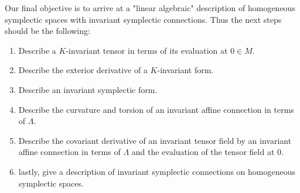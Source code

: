 \documentclass[a4paper,12pt,parskip=half*,chapterprefix=true,numbers=noendperiod]{scrreprt}
\theoremstyle{definition}
\theoremstyle{remark}
\begin{document}
Our final objective is to arrive at a "linear algebraic" description of homogeneous symplectic spaces with invariant symplectic connections. Thus the next steps should be the following:
\begin{enumerate}
	\item Describe a $K$-invariant tensor in terms of its evaluation at $0\in M$.
	\item Describe the exterior derivative of a $K$-invariant form.
	\item Describe an invariant symplectic form.
	\item Describe the curvature and torsion of an invariant affine connection in terms of $\Lambda$.
	\item Describe the covariant derivative of an invariant tensor field by an invariant affine connection in terms of $\Lambda$ and the evaluation of the tensor field at $0$.
	\item lastly, give a description of invariant symplectic connections on homogeneous symplectic spaces.
\end{enumerate}

\printbibliography
\end{document}
